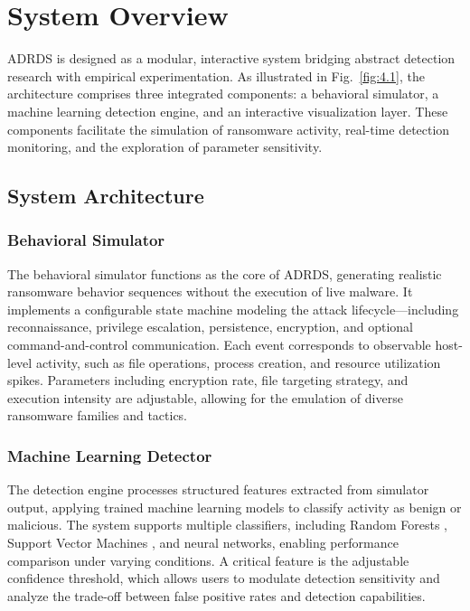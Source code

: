 \section{System Overview}

ADRDS is designed as a modular, interactive system bridging abstract detection research with empirical experimentation. As illustrated in Fig.~\ref{fig:4.1}, the architecture comprises three integrated components: a behavioral simulator, a machine learning detection engine, and an interactive visualization layer. These components facilitate the simulation of ransomware activity, real-time detection monitoring, and the exploration of parameter sensitivity.

\subsection{System Architecture}

\subsubsection{Behavioral Simulator}
The behavioral simulator functions as the core of ADRDS, generating realistic ransomware behavior sequences without the execution of live malware. It implements a configurable state machine modeling the attack lifecycle—including reconnaissance, privilege escalation, persistence, encryption, and optional command-and-control communication. Each event corresponds to observable host-level activity, such as file operations, process creation, and resource utilization spikes. Parameters including encryption rate, file targeting strategy, and execution intensity are adjustable, allowing for the emulation of diverse ransomware families and tactics.

\subsubsection{Machine Learning Detector}
The detection engine processes structured features extracted from simulator output, applying trained machine learning models to classify activity as benign or malicious. The system supports multiple classifiers, including Random Forests \cite{breiman2001random}, Support Vector Machines \cite{takeuchi2018detecting}, and neural networks, enabling performance comparison under varying conditions. A critical feature is the adjustable confidence threshold, which allows users to modulate detection sensitivity and analyze the trade-off between false positive rates and detection capabilities.

